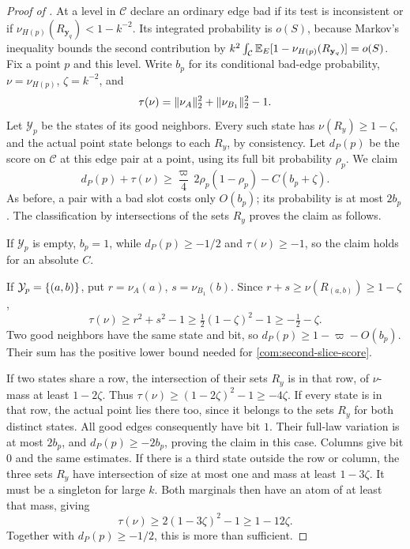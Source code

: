 \begin{proof}[Proof of ]
At a level in $\mathcal C$ declare an ordinary edge bad if its test is inconsistent
or if
\(\nu_{H(p)}(R_{\mathbf y_q})<1-k^{-2}\). Its integrated probability is \(o(S)\),
because Markov's inequality bounds the second contribution by
\(k^2\int_{\mathcal C}\mathbb E_E[1-\nu_{H(p)}(R_{\mathbf y_q})]=o(S)\).
Fix a point \(p\) and this level. Write \(b_p\) for its conditional bad-edge
probability, \(\nu=\nu_{H(p)}\), \(\zeta=k^{-2}\), and
\[
 \tau(\nu)=\lVert \nu_A\rVert_2^2+\lVert \nu_{B_1}\rVert_2^2-1.
\]
Let \(\mathcal Y_p\) be the states of its good neighbors. Every such state
has \(\nu(R_y)\ge1-\zeta\), and the actual point state belongs to each
\(R_y\), by consistency. Let \(d_P(p)\) be the score on $\mathcal C$ at this
edge pair at a point, using its full bit probability \(\rho_p\). We claim
\begin{equation}\label{com:second-slice-score}
 d_P(p)+\tau(\nu)
 \ge\frac\varpi4\,2\rho_p(1-\rho_p)-C(b_p+\zeta).
\end{equation}
As before, a pair with a bad slot costs only \(O(b_p)\); its probability is
at most \(2b_p\). The classification by intersections of the sets \(R_y\) proves the claim as
follows.

If \(\mathcal Y_p\) is empty, \(b_p=1\), while \(d_P(p)\ge-1/2\) and
\(\tau(\nu)\ge-1\), so the claim holds for an absolute \(C\).

If \(\mathcal Y_p=\{(a,b)\}\), put
\(r=\nu_A(a)\), \(s=\nu_{B_1}(b)\). Since
\(r+s\ge\nu(R_{(a,b)})\ge1-\zeta\),
\[
 \tau(\nu)\ge r^2+s^2-1
        \ge\tfrac12(1-\zeta)^2-1\ge-\tfrac12-\zeta.
\]
Two good neighbors have the same state and bit, so
\(d_P(p)\ge1-\varpi-O(b_p)\). Their sum has the positive lower bound
needed for \eqref{com:second-slice-score}.

If two states share a row, the intersection of their sets \(R_y\) is in that row, of
\(\nu\)-mass at least \(1-2\zeta\). Thus
\(\tau(\nu)\ge(1-2\zeta)^2-1\ge-4\zeta\).
If every state is in that row, the actual point lies there too, since it
belongs to the sets \(R_y\) for both distinct states. All good edges consequently
have bit \(1\). Their full-law variation is at most \(2b_p\), and
\(d_P(p)\ge-2b_p\), proving the claim in this case. Columns give bit \(0\)
and the same estimates. If there is a third state outside the row or column,
the three sets \(R_y\) have intersection of size at most one and mass at least
\(1-3\zeta\). It must be a singleton for large \(k\). Both marginals then
have an atom of at least that mass, giving
\[
 \tau(\nu)\ge2(1-3\zeta)^2-1\ge1-12\zeta.
\]
Together with \(d_P(p)\ge-1/2\), this is more than sufficient.


\end{proof}
